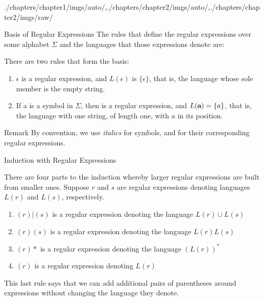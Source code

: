 \begin{graphicspathcontext}{{./chapters/chapter1/imgs/auto/},{./chapters/chapter2/imgs/auto/},{./chapters/chapter2/imgs/raw/}}
\begin{bibunit}[apalike]
\begin{frame}{Basis of Regular Expressions}
	The rules that define the regular expressions over some alphabet $\Sigma$ and the languages that those expressions denote are:
	\vspace{.25cm}
	\begin{definition}[BASIS]
	There are two rules that form the basis: \begin{enumerate}
	\item $\epsilon$ is a regular expression, and $L(\epsilon)$ is $\{\epsilon\}$, that is, the language whose sole member is the empty string.
	\item If a is a symbol in $\Sigma$, then  is a regular expression, and $L({\textbf{a}}) = \{a\}$, that is, the language with one string, of length one, with $a$ in its position.
	\end{enumerate}
	\end{definition}
	\vspace{.25cm}
	\begin{block}{\smaller Remark}\smaller 
		By convention, we use \textit{italics} for symbols, and  for their corresponding regular expressions.
	\end{block}
\end{frame}

\begin{frame}{Induction with Regular Expressions}
	\begin{definition}[INDUCTION]
	There are four parts to the induction whereby larger regular expressions are built from smaller ones. Suppose $r$ and $s$ are regular expressions denoting languages $L(r)$ and $L(s)$, respectively.
	\begin{enumerate}
	\item $(r)|(s)$ is a regular expression denoting the language $L(r) \cup L(s)$
	\item $(r)(s)$ is a regular expression denoting the language $L(r)L(s)$
	\item $(r)*$ is a regular expression denoting the language $(L(r))^*$
	\item $(r)$ is a regular expression denoting $L(r)$
	\end{enumerate}
	\end{definition}
	This last rule says that we can add additional pairs of parentheses around expressions without changing the language they denote.
\end{frame}


\end{bibunit}
\end{graphicspathcontext}
